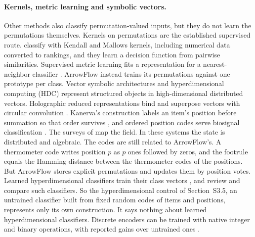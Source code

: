 \paragraph{Kernels, metric learning and symbolic vectors.}
Other methods also classify permutation-valued inputs, but they do not learn the permutations themselves. Kernels on permutations are the established supervised route. \citet{jiao2015kernels,jiao2018kendall} classify with Kendall and Mallows kernels, including numerical data converted to rankings, and they learn a decision function from pairwise similarities. Supervised metric learning fits a representation for a nearest-neighbor classifier \citep{goldberger2004nca,weinberger2009lmnn}. ArrowFlow instead trains its permutations against one prototype per class. Vector symbolic architectures and hyperdimensional computing (HDC) represent structured objects in high-dimensional distributed vectors. Holographic reduced representations bind and superpose vectors with circular convolution \citep{plate1995hrr}. Kanerva's construction labels an item's position before summation so that order survives \citep{kanerva2009hdc}, and ordered position codes serve biosignal classification \citep{rahimi2018biosignal}. The surveys of \citet{kleyko2022survey1,kleyko2023survey2} map the field. In these systems the state is distributed and algebraic. The codes are still related to ArrowFlow's. A thermometer code writes position $p$ as $p$ ones followed by zeros, and the footrule equals the Hamming distance between the thermometer codes of the positions. But ArrowFlow stores explicit permutations and updates them by position votes. Learned hyperdimensional classifiers train their class vectors \citep{duan2022lehdc,smets2025margin}, and \citet{verges2025hdcclassification} review and compare such classifiers. So the hyperdimensional control of Section~S3.5, an untrained classifier built from fixed random codes of items and positions, represents only its own construction. It says nothing about learned hyperdimensional classifiers. Discrete encoders can be trained with native integer and binary operations, with reported gains over untrained ones \citep{kirby2026encoder}.

